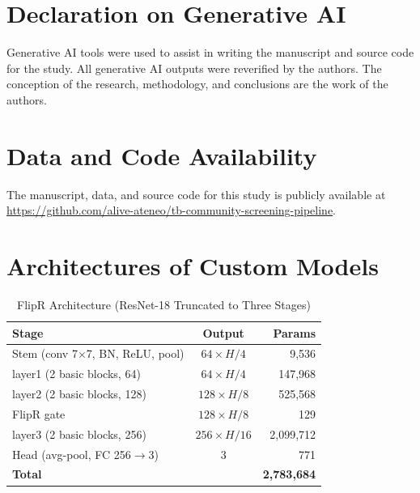 \documentclass[conference, letterpaper]{IEEEtran}
\begin{document}
\section*{Declaration on Generative AI}

Generative AI tools were used to assist in writing the manuscript and source code for the study. All generative AI outputs were reverified by the authors. The conception of the research, methodology, and conclusions are the work of the authors.

\section*{Data and Code Availability}

The manuscript, data, and source code for this study is publicly available at \url{https://github.com/alive-ateneo/tb-community-screening-pipeline}.

\appendices
\section{Architectures of Custom Models}
\label{app:architectures}

\begin{table}[!ht]
\renewcommand{\arraystretch}{1.2}
\centering
\begin{threeparttable}
\caption{FlipR Architecture (ResNet-18 Truncated to Three Stages)}
\label{tab:arch_flipr}
\footnotesize
\begin{tabularx}{\columnwidth}{@{}X c r@{}}
\toprule
\textbf{Stage} & \textbf{Output} & \textbf{Params} \\
\midrule
Stem (conv 7$\times$7, BN, ReLU, pool) & $64\times H/4$ & 9,536 \\
layer1 (2 basic blocks, 64) & $64\times H/4$ & 147,968 \\
layer2 (2 basic blocks, 128) & $128\times H/8$ & 525,568 \\
FlipR gate & $128\times H/8$ & 129 \\
layer3 (2 basic blocks, 256) & $256\times H/16$ & 2,099,712 \\
Head (avg-pool, FC 256$\to$3) & 3 & 771 \\
\midrule
\textbf{Total} & & \textbf{2,783,684} \\
\bottomrule
\end{tabularx}
\end{threeparttable}
\end{table}
\end{document}
